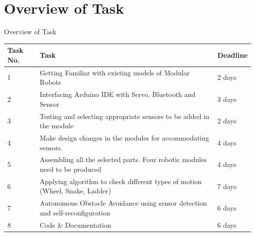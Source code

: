 \documentclass[10pt, a4paper]{beamer}
\begin{document}
\section{Overview of Task}
\begin{frame}{Overview of Task}
	\begin{center}
    \begin{tabular}{ | l | p{6cm} | l |}
    \hline
     \textbf{Task No.} & \textbf{Task} & \textbf{Deadline}\\ \hline
     1 & Getting Familiar with existing models of Modular Robots & 2 days  \\ \hline
     
     2 & Interfacing Arduino IDE with Servo, Bluetooth and Sensor & 3 days  \\ \hline
     
     3 & Testing and selecting appropriate sensors to be added in the module & 2 days  \\ \hline
     
     4 & Make design changes in the modules for accommodating sensors.  & 4 days  \\ \hline
      
     5 & Assembling all the selected parts. Four robotic modules need to be produced & 4 days  \\ \hline
     
     6 & Applying algorithm to check different types of motion (Wheel, Snake, Ladder)  & 7 days  \\ \hline
     
     7 & Autonomous Obstacle Avoidance using sensor detection and self-reconfiguration & 6 days  \\ \hline
     
     8 & Code \& Documentation & 6 days  \\ \hline
     
    
    \end{tabular}
\end{center}
	
\end{frame}
\end{document}
